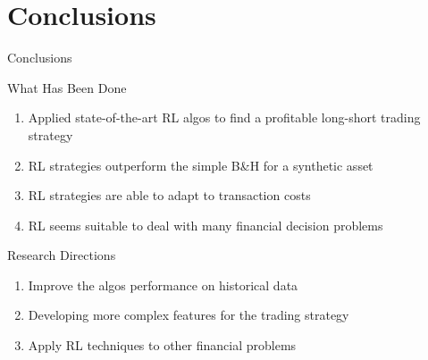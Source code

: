\section{Conclusions}

\begin{frame}{Conclusions}
	\begin{block}{What Has Been Done}
		\begin{enumerate}
			\item Applied state-of-the-art RL algos to find a profitable long-short trading strategy
			\item RL strategies outperform the simple B\&H for a synthetic asset
			\item RL strategies are able to adapt to transaction costs
			\item RL seems suitable to deal with many financial decision problems 
			
		\end{enumerate}
	\end{block}
	
	\begin{block}{Research Directions}
		\begin{enumerate}
			\item Improve the algos performance on historical data
			\item Developing more complex features for the trading strategy
			\item Apply RL techniques to other financial problems 
		\end{enumerate}
	\end{block}
\end{frame}


